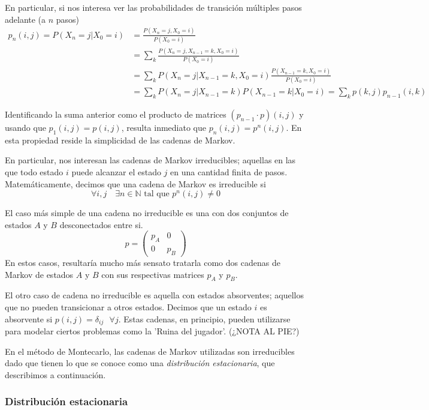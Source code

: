 En particular, si nos interesa ver las probabilidades de transición múltiples pasos adelante (a $n$ pasos)
\begin{align*}
 p_n(i,j) = P(X_n = j | X_0 = i) &= \frac{P(X_n = j, X_0 = i)}{P(X_0 = i)} \\
 &= \sum_k \frac{P(X_n = j, X_{n-1}=k, X_0 = i)}{P(X_0 = i)} \\
 &= \sum_k P(X_n = j| X_{n-1}=k, X_0 = i)\frac{P(X_{n-1}=k, X_0 = i)}{P(X_0 = i)} \\
 &= \sum_k P(X_n = j| X_{n-1}=k)P(X_{n-1}=k| X_0 = i) = \sum_k p(k,j)p_{n-1}(i,k)
\end{align*}

Identificando la suma anterior como el producto de matrices $(p_{n-1} \cdot p)(i,j)$ y usando que $p_1(i,j)=p(i,j)$, resulta inmediato que $p_n(i,j) = p^n(i,j)$.
En esta propiedad reside la simplicidad de las cadenas de Markov.

En particular, nos interesan las cadenas de Markov irreducibles; aquellas en las que todo estado $i$ puede alcanzar el estado $j$ en una cantidad finita de pasos.
Matemáticamente, decimos que una cadena de Markov es irreducible si
\[ \forall i,j \quad \exists n\in \mathbb{N} \text{ tal que } p^n(i,j) \neq 0 \]

El caso más simple de una cadena no irreducible es una con dos conjuntos de estados $A$ y $B$ desconectados entre si.
\[ p =
\begin{pmatrix}
 p_A & 0\\
 0 & p_B
\end{pmatrix} \]
En estos casos, resultaría mucho más sensato tratarla como dos cadenas de Markov de estados $A$ y $B$ con sus respectivas matrices $p_A$ y $p_B$.

El otro caso de cadena no irreducible es aquella con estados absorventes; aquellos que no pueden transicionar a otros estados.
Decimos que un estado $i$ es absorvente si $p(i,j)=\delta_{ij} \text{ } \forall j$.
Estas cadenas, en principio, pueden utilizarse para modelar ciertos problemas como la 'Ruina del jugador'. (¿NOTA AL PIE?)

En el método de Montecarlo, las cadenas de Markov utilizadas son irreducibles dado que tienen lo que se conoce como una \textit{distribución estacionaria}, que describimos a continuación.

\subsubsection{Distribución estacionaria}

